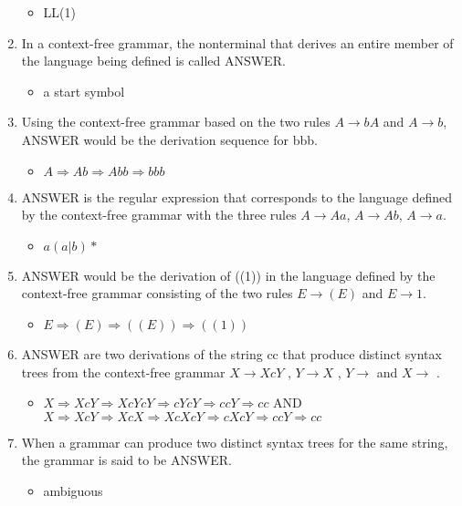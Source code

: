 \documentclass{exam}
\begin{document}
\begin{enumerate}
\begin{itemize}
\item LL(1)
\end{itemize}
\item In a context-free grammar, the nonterminal that derives an entire member of the language being defined is called ANSWER.
\begin{itemize}
\item a start symbol
\end{itemize}
\item Using the context-free grammar based on the two rules $A \rightarrow b A$ and $A \rightarrow b$, ANSWER would be the derivation sequence for bbb.
\begin{itemize}
\item $A \Rightarrow Ab \Rightarrow Abb \Rightarrow bbb$
\end{itemize}
\item ANSWER is the regular expression that corresponds to the language defined by the context-free grammar with the three rules $A \rightarrow A a$, $A \rightarrow A b$, $A \rightarrow a$.
\begin{itemize}
\item $a (a|b)*$
\end{itemize}
\item ANSWER would be the derivation of ((1)) in the language defined by the context-free grammar consisting of the two rules $E \rightarrow ( E )$ and $E \rightarrow 1$.
\begin{itemize}
\item $E \Rightarrow (E) \Rightarrow ((E)) \Rightarrow ((1))$
\end{itemize}
\item ANSWER are two derivations of the string cc that produce distinct syntax trees from the context-free grammar $X \rightarrow X c Y$ , $Y \rightarrow X$ ,  $Y \rightarrow$ and $X \rightarrow$ .
\begin{itemize}
\item $X \Rightarrow XcY \Rightarrow XcYcY \Rightarrow cYcY \Rightarrow ccY \Rightarrow cc$ AND $X \Rightarrow XcY \Rightarrow XcX \Rightarrow XcXcY \Rightarrow cXcY \Rightarrow ccY \Rightarrow cc$
\end{itemize}
\item When a grammar can produce two distinct syntax trees for the same string, the grammar is said to be ANSWER.
\begin{itemize}
\item ambiguous
\end{itemize}

\end{enumerate}
\end{document}
